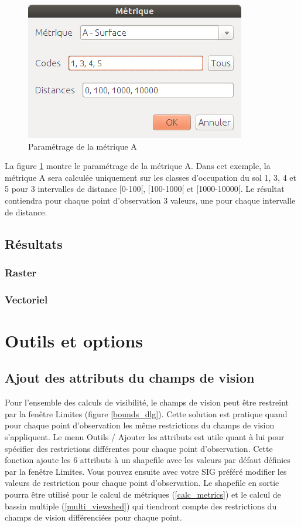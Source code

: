 \documentclass{report}
\begin{document}
\begin{figure}[H]
	\includegraphics[scale=0.5]{img/metric_param-fr.png} 
	\caption{Paramétrage de la métrique A}
	\label{metric_param_dlg}
\end{figure}

La figure \ref{metric_param_dlg} montre le paramétrage de la métrique A. Dans cet exemple, la métrique A sera calculée uniquement sur les classes d'occupation du sol 1, 3, 4 et 5 pour 3 intervalles de distance [0-100[, [100-1000[ et [1000-10000[. Le résultat contiendra pour chaque point d'observation 3 valeurs, une pour chaque intervalle de distance.

\subsection{Résultats}

\subsubsection{Raster}

\subsubsection{Vectoriel}


\section{Outils et options}
\label{tools}

\subsection{Ajout des attributs du champs de vision}
\label{add_attributes}
Pour l'ensemble des calculs de visibilité, le champs de vision peut être restreint par la fenêtre Limites (figure \ref{bounds_dlg}). Cette solution est pratique quand pour chaque point d'observation les même restrictions du champs de vision s'appliquent. 
Le menu Outils / Ajouter les attributs est utile quant à lui pour spécifier des restrictions différentes pour chaque point d'observation. Cette fonction ajoute les 6 attributs à un shapefile avec les valeurs par défaut définies par la fenêtre Limites. Vous pouvez ensuite avec votre SIG préféré modifier les valeurs de restriction pour chaque point d'observation. 
Le shapefile en sortie pourra être utilisé pour le calcul de métriques (\ref{calc_metrics}) et le calcul de bassin multiple (\ref{multi_viewshed}) qui tiendront compte des restrictions du champs de vision différenciées pour chaque point.
\end{document}
